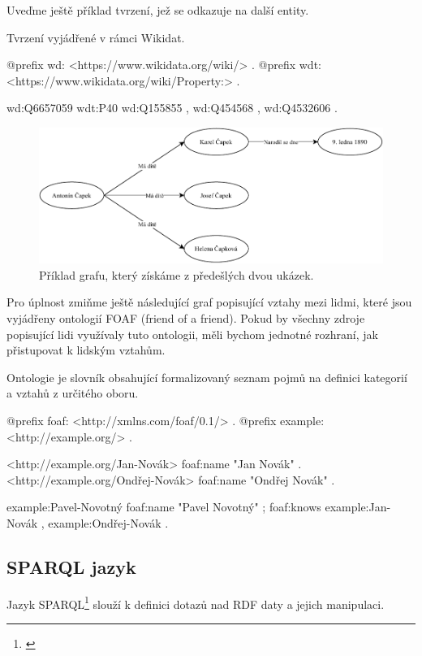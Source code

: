 Uveďme ještě příklad tvrzení, jež se odkazuje na další entity.
\begin{prikl}
Tvrzení  vyjádřené v rámci Wikidat.
\begin{code}
@prefix wd: <https://www.wikidata.org/wiki/> .
@prefix wdt: <https://www.wikidata.org/wiki/Property:> .

wd:Q6657059 wdt:P40 wd:Q155855 ,
                    wd:Q454568 ,
                    wd:Q4532606 .
\end{code}
\end{prikl}

\begin{figure}[h]
    \centering
    \includegraphics[width=\textwidth]{media/rdf.pdf}
    \caption{Příklad grafu, který získáme z předešlých dvou ukázek.}
\end{figure}

Pro úplnost zmiňme ještě následující graf popisující vztahy mezi lidmi, které jsou vyjádřeny ontologií FOAF (friend of a friend). Pokud by všechny zdroje popisující lidi využívaly tuto ontologii, měli bychom jednotné rozhraní, jak přistupovat k lidským vztahům.

Ontologie je slovník obsahující formalizovaný seznam pojmů na definici kategorií a vztahů z určitého oboru.

\begin{code}
@prefix foaf: <http://xmlns.com/foaf/0.1/> .
@prefix example: <http://example.org/> .

<http://example.org/Jan-Novák> foaf:name "Jan Novák" .
<http://example.org/Ondřej-Novák> foaf:name "Ondřej Novák" .

example:Pavel-Novotný foaf:name "Pavel Novotný" ;
                      foaf:knows example:Jan-Novák ,
                                 example:Ondřej-Novák .
\end{code}

\subsection{SPARQL jazyk}\label{SPARQL}
Jazyk SPARQL\footnote{\citet{Seaborne:13:SQL}} slouží k definici dotazů nad RDF daty a jejich manipulaci.

